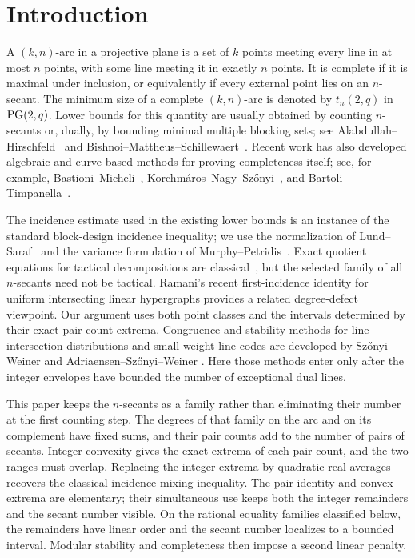 \section{Introduction}

A \((k,n)\)-arc in a projective plane is a set of \(k\) points meeting every
line in at most \(n\) points, with some line meeting it in exactly \(n\)
points.  It is complete if it is maximal under inclusion, or equivalently if
every external point lies on an \(n\)-secant.  The minimum size of a complete
\((k,n)\)-arc is denoted by \(t_n(2,q)\) in
\(\mathrm{PG}(2,q)\).  Lower bounds for this quantity are usually obtained by counting
\(n\)-secants or, dually, by bounding minimal multiple blocking sets; see
Alabdullah--Hirschfeld~\cite{AlabdullahHirschfeld} and
Bishnoi--Mattheus--Schillewaert~\cite{BMS}.  Recent work has also developed
algebraic and curve-based methods for proving completeness itself; see, for
example, Bastioni--Micheli~\cite{BastioniMicheli},
Korchm\'aros--Nagy--Sz\H{o}nyi~\cite{KNS}, and
Bartoli--Timpanella~\cite{BartoliTimpanella}.

The incidence estimate used in the existing lower bounds is an instance of
the standard block-design incidence inequality; we use the normalization of
Lund--Saraf~\cite{LundSaraf} and the variance formulation of
Murphy--Petridis~\cite{MurphyPetridis}.  Exact quotient equations for tactical
decompositions are classical~\cite{BekerMitchellPiper}, but the selected
family of all \(n\)-secants need not be tactical.  Ramani's recent
first-incidence identity for uniform intersecting linear hypergraphs
\cite{Ramani} provides a related degree-defect viewpoint.  Our argument uses
both point classes and the intervals determined by their exact pair-count
extrema.  Congruence and stability methods for line-intersection
distributions and small-weight line codes are developed by
Sz\H{o}nyi--Weiner and Adriaensen--Sz\H{o}nyi--Weiner
\cite{SWmodp,SWeven,AdriaensenSzonyiWeiner}.  Here those methods enter only
after the integer envelopes have bounded the number of exceptional dual
lines.

This paper keeps the \(n\)-secants as a family rather than eliminating their
number at the first counting step.  The degrees of that family on the arc and
on its complement have fixed sums, and their pair counts add to the number of
pairs of secants.  Integer convexity gives the exact extrema of each pair
count, and the two ranges must overlap.  Replacing the integer extrema by
quadratic real averages recovers the classical incidence-mixing inequality.
The pair identity and convex extrema are elementary; their simultaneous use
keeps both the integer remainders and the secant number visible.  On the
rational equality families classified below, the remainders have linear order
and the secant number localizes to a bounded interval.  Modular stability and
completeness then impose a second linear penalty.

